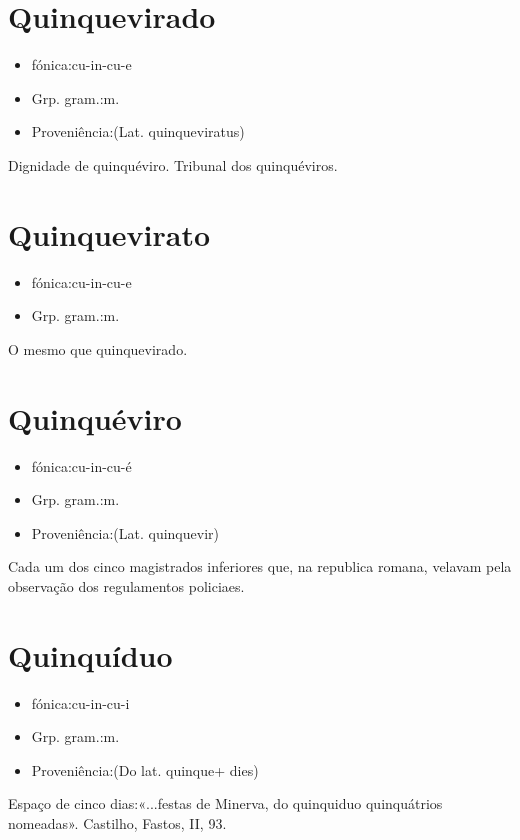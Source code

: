 \section{Quinquevirado}
\begin{itemize}
\item {fónica:cu-in-cu-e}
\end{itemize}
\begin{itemize}
\item {Grp. gram.:m.}
\end{itemize}
\begin{itemize}
\item {Proveniência:(Lat. \textunderscore quinqueviratus\textunderscore )}
\end{itemize}
Dignidade de quinquéviro.
Tribunal dos quinquéviros.
\section{Quinquevirato}
\begin{itemize}
\item {fónica:cu-in-cu-e}
\end{itemize}
\begin{itemize}
\item {Grp. gram.:m.}
\end{itemize}
O mesmo que \textunderscore quinquevirado\textunderscore .
\section{Quinquéviro}
\begin{itemize}
\item {fónica:cu-in-cu-é}
\end{itemize}
\begin{itemize}
\item {Grp. gram.:m.}
\end{itemize}
\begin{itemize}
\item {Proveniência:(Lat. \textunderscore quinquevir\textunderscore )}
\end{itemize}
Cada um dos cinco magistrados inferiores que, na republica romana, velavam pela observação dos regulamentos policiaes.
\section{Quinquíduo}
\begin{itemize}
\item {fónica:cu-in-cu-i}
\end{itemize}
\begin{itemize}
\item {Grp. gram.:m.}
\end{itemize}
\begin{itemize}
\item {Proveniência:(Do lat. \textunderscore quinque\textunderscore  + \textunderscore dies\textunderscore )}
\end{itemize}
Espaço de cinco dias:«\textunderscore ...festas de Minerva, do quinquiduo quinquátrios nomeadas\textunderscore ». Castilho, \textunderscore Fastos\textunderscore , II, 93.

